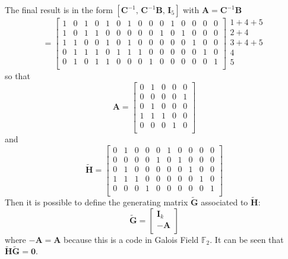 \documentclass[10pt]{article}
\begin{document}
The final result is in the form $[\mathbf{C}^{-1}, \, \mathbf{C}^{-1}\mathbf{B}, \, \mathbf{I}_{5}]$ with $\mathbf{A} = \mathbf{C}^{-1}\mathbf{B}$
\begin{equation}
	[\mathbf{C}^{-1}, \mathbf{C}^{-1}\mathbf{B}, \mathbf{I}_{5}] = 
	\left[
	\begin{array}{ccccccccccccccc}
		1&0&1&0&1&0&1&0&0&0&1&0&0&0&0\\
		1&0&1&1&0&0&0&0&0&1&0&1&0&0&0\\
		1&1&0&0&1&0&1&0&0&0&0&0&1&0&0\\
		0&1&1&1&0&1&1&1&0&0&0&0&0&1&0\\
		0&1&0&1&1&0&0&0&1&0&0&0&0&0&1\\
	\end{array}
	\right]
	\begin{array}{l}
		1 + 4 + 5 \\
		2 + 4 \\
		3 + 4 + 5 \\
		4 \\
		5 \\
	\end{array}
\end{equation}
so that 
\begin{equation}
	\mathbf{A} = 
	\begin{bmatrix}
		0&1&0&0&0\\0&0&0&0&1\\0&1&0&0&0\\1&1&1&0&0\\0&0&0&1&0\\
	\end{bmatrix}
\end{equation}
and 
\begin{equation}
	\mathbf{\tilde{H}} = 
	\begin{bmatrix}

		0&1&0&0&0&1&0&0&0&0\\0&0&0&0&1&0&1&0&0&0\\0&1&0&0&0&0&0&1&0&0\\1&1&1&0&0&0&0&0&1&0\\0&0&0&1&0&0&0&0&0&1\\
	\end{bmatrix}
\end{equation}
Then it is possible to define the generating matrix $\mathbf{\tilde{G}}$ associated to $\mathbf{\tilde{H}}$:
\begin{equation}
	\mathbf{\tilde{G}} = 
	\begin{bmatrix}
		\mathbf{I}_k \\
		- \mathbf{A} \\
	\end{bmatrix}
\end{equation}
where $-\mathbf{A} = \mathbf{A}$ because this is a code in Galois Field $\mathbb{F}_2$. It can be seen that $\mathbf{\tilde{H}}\mathbf{\tilde{G}} = \mathbf{0}$.
\end{document}
